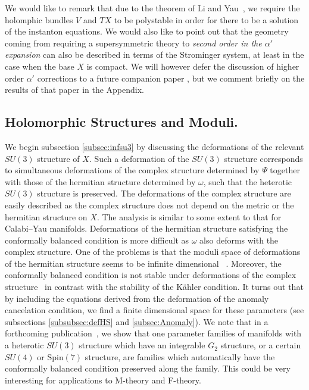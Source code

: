 \documentclass[12pt,a4paper]{article}
\theoremstyle{definition}
\begin{document}
We would like to remark that due to the theorem of Li and Yau~\citep{MR915839}, we require the holomphic bundles $V$ and $TX$ to be polystable in order for there to be a solution of the instanton equations. We would also like to point out that the geometry coming from requiring a supersymmetric theory to {\it second order in the $\alpha'$ expansion} can also be described in terms of the Strominger system, at least in the case when the base $X$ is compact. We will however defer the discussion of higher order $\alpha'$ corrections to a future companion paper \cite{delaossa2014}, but we comment briefly on the results of that paper in the Appendix. 


\subsection{Holomorphic Structures and Moduli.}
We begin subsection \ref{subsec:infsu3} by discussing the deformations of the relevant $SU(3)$ structure of $X$.  Such a deformation of the $SU(3)$ structure corresponds to simultaneous deformations of the complex structure determined by $\Psi$ together with those of the hermitian structure determined by $\omega$, such that the heterotic $SU(3)$ structure is preserved. The deformations of the complex structure are easily described as the complex structure does not depend on the metric or the hermitian structure on $X$.  The analysis is similar to some extent to that for Calabi--Yau manifolds. Deformations of the hermitian structure satisfying the conformally balanced condition is more difficult as $\omega$ also deforms with the complex structure. One of the problems is that the moduli space of deformations of the hermitian structure seems to be infinite dimensional ~\citep{Becker:2006xp}.  Moreover, the conformally balanced condition is not stable under deformations of the complex structure~\citep{MR1107661, MR1137099, 0735.32009, 0793.53068} in contrast with the stability of the K\"ahler condition.  It turns out that by including the equations derived from the deformation of the anomaly cancelation condition, we find a finite dimensional space for these parameters (see subsections \ref{subsubsec:defHS} and \ref{subsec:Anomaly}).  We note that in a forthcoming publication~\citep{DKS2014}, we show that one parameter families of manifolds with a heterotic $SU(3)$ structure which have an integrable $G_2$ structure, or a certain $SU(4)$ or $\text{Spin}(7)$ structure, are families which automatically have the conformally balanced condition preserved along the family.  This could be very interesting for applications to M-theory and F-theory. 
\end{document}
